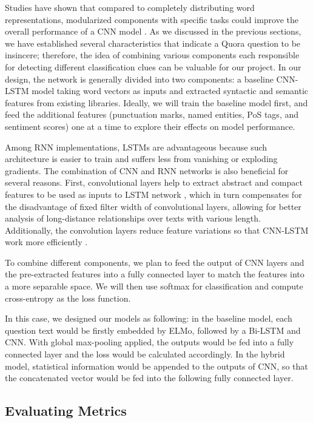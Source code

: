 \documentclass[12pt]{diazessay} %
\begin{document}
Studies have shown that compared to completely distributing word representations, modularized components with specific tasks could improve the overall performance of a CNN model \citep{poria2017}. As we discussed in the previous sections, we have established several characteristics that indicate a Quora question to be insincere; therefore, the idea of combining various components each responsible for detecting different classification clues can be valuable for our project. In our design, the network is generally divided into two components: a baseline CNN-LSTM model taking word vectors as inputs and extracted syntactic and semantic features from existing libraries. Ideally, we will train the baseline model first, and feed the additional features (punctuation marks, named entities, PoS tags, and sentiment scores) one at a time to explore their effects on model performance. 

Among RNN implementations, LSTMs are advantageous because such architecture is easier to train and suffers less from vanishing or exploding gradients. The combination of CNN and RNN networks is also beneficial for several reasons. First, convolutional layers help to extract abstract and compact features to be used as inputs to LSTM network \citep{chan2015}, which in turn compensates for the disadvantage of fixed filter width of convolutional layers, allowing for better analysis of long-distance relationships over texts with various length. Additionally, the convolution layers reduce feature variations so that CNN-LSTM work more efficiently \citep{ghosh2016}. 

To combine different components, we plan to feed the output of CNN layers and the pre-extracted features into a fully connected layer to match the features into a more separable space. We will then use softmax for classification and compute cross-entropy as the loss function. 

In this case, we designed our models as following: in the baseline model, each question text would be firstly embedded by ELMo, followed by a Bi-LSTM and CNN. With global max-pooling applied, the outputs would be fed into a fully connected layer and the loss would be calculated accordingly. In the hybrid model, statistical information would be appended to the outputs of CNN, so that the concatenated vector would be fed into the following fully connected layer.

\subsection{Evaluating Metrics}
\end{document}
